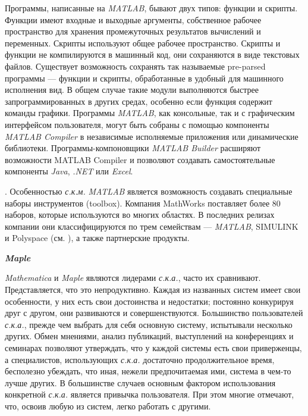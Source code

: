 Программы, написанные на \textit{MATLAB}, бывают двух типов: функции и скрипты. Функции имеют входные и выходные аргументы, собственное рабочее пространство для хранения промежуточных результатов вычислений и переменных. Скрипты используют общее рабочее пространство. Скрипты и функции не компилируются в машинный код, они сохраняются в виде текстовых файлов. Существует возможность сохранять так называемые pre-parsed программы --- функции и скрипты, обработанные в удобный для машинного исполнения вид. В общем случае такие модули выполняются быстрее запрограммированных в других средах, особенно если функция содержит команды графики.
Программы \textit{MATLAB}, как консольные, так и с графическим интерфейсом пользователя, могут быть собраны с помощью компоненты \textit{MATLAB Compiler} в независимые исполняемые приложения или динамические библиотеки. Программы-компоновщики \textit{MATLAB Builder} расширяют возможности MATLAB Compiler и позволяют создавать самостоятельные компоненты \textit{Java}, \textit{.NET} или \textit{Excel}.

.
Особенностью \textit{с.к.м.} \textit{MATLAB} является возможность создавать специальные наборы инструментов (toolbox). Компания MathWorks поставляет более 80 наборов, которые используются во многих областях. В последних релизах компании они классифицируются по трем семействам --- \textit{MATLAB}, SIMULINK и Polyspace (см. ), а также партнерские продукты.

\textbf{\textit{Maple}}

\textit{Mathematica} и \textit{Maple} являются лидерами \textit{с.к.а.}, часто их сравнивают. Представляется, что это непродуктивно. Каждая из названных систем имеет свои особенности, у них есть свои достоинства и недостатки; постоянно конкурируя друг с другом, они развиваются и совершенствуются. Большинство пользователей \textit{с.к.а.}, прежде чем выбрать для себя основную систему, испытывали несколько других. Обмен мнениями, анализ публикаций, выступлений на конференциях и семинарах позволяют утверждать, что у каждой системы есть свои приверженцы, а специалистов, использующих \textit{с.к.а.} достаточно продолжительное время, бесполезно убеждать, что иная, нежели предпочитаемая ими, система в чем-то лучше других. В большинстве случаев основным фактором использования конкретной \textit{с.к.а.} является привычка пользователя. При этом многие отмечают, что, освоив любую из систем, легко работать с другими.

